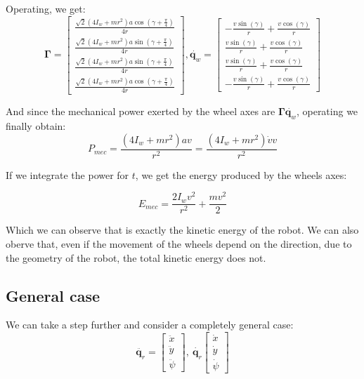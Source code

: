 \documentclass[12pt]{article}
\renewcommand{\vec}[1]{\bm{#1}}
\def\Torque{\vec \Gamma}
\def\q{\vec q}
\begin{document}
Operating, we get: 
$$\Torque = \left[\begin{matrix}\frac{\sqrt{2} \left(4 I_{w} + m r^{2}\right) a \operatorname{cos}\left(\gamma + \frac{\pi}{4}\right)}{4 r}\\\frac{\sqrt{2} \left(4 I_{w} + m r^{2}\right) a \operatorname{sin}\left(\gamma + \frac{\pi}{4}\right)}{4 r}\\\frac{\sqrt{2} \left(4 I_{w} + m r^{2}\right) a \operatorname{sin}\left(\gamma + \frac{\pi}{4}\right)}{4 r}\\\frac{\sqrt{2} \left(4 I_{w} + m r^{2}\right) a \operatorname{cos}\left(\gamma + \frac{\pi}{4}\right)}{4 r}\end{matrix}\right] ,
 \dot{\q_w} =  \left[\begin{matrix}- \frac{v \operatorname{sin}\left(\gamma\right)}{r} + \frac{v \operatorname{cos}\left(\gamma\right)}{r}\\\frac{v \operatorname{sin}\left(\gamma\right)}{r} + \frac{v \operatorname{cos}\left(\gamma\right)}{r}\\\frac{v \operatorname{sin}\left(\gamma\right)}{r} + \frac{v \operatorname{cos}\left(\gamma\right)}{r}\\- \frac{v \operatorname{sin}\left(\gamma\right)}{r} + \frac{v \operatorname{cos}\left(\gamma\right)}{r}\end{matrix}\right]$$

And since the mechanical power exerted by the wheel axes are $\Torque  \dot{\q_w}$, operating we finally obtain:
$$ P_{mec} =\frac{\left(4 I_{w} + m r^{2}\right) a v}{r^{2}} =\frac{\left(4 I_{w} + m r^{2}\right) \dot{v} v}{r^{2}}$$

If we integrate the power for $t$, we get the energy produced by the wheels axes:

$$E_{mec} = \frac{2 I_{w} v^{2}}{r^{2}} + \frac{m v^{2}}{2}$$

Which we can observe that is exactly the kinetic energy of the robot. We can also oberve that, even if the movement of the wheels depend on the direction, due to the geometry of the robot, the total kinetic energy does not. 

\subsection*{General case}

We can take a step further and consider a completely general case:
$$\ddot{\q_r} = \left[\begin{matrix}\ddot{x}\\\ddot{y}\\\ddot{\psi}\end{matrix}\right], \ \dot{\q_r} \left[\begin{matrix}\dot{x}\\\dot{y}\\\dot{\psi}\end{matrix}\right]$$
\end{document}
